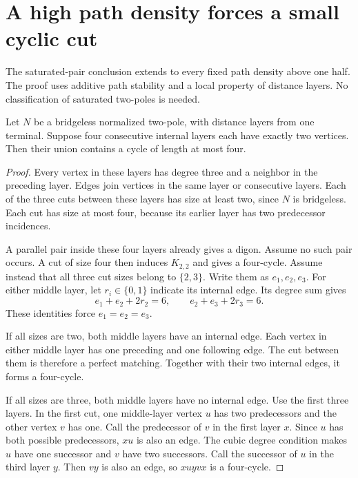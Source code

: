 \section{A high path density forces a small cyclic cut}
\label{sec:high-density-small-cut}

The saturated-pair conclusion extends to every fixed path density above one half.
The proof uses additive path stability and a local property of distance layers.
No classification of saturated two-poles is needed.

\begin{lemma}
\label{lem:four-thin-layers-short-cycle}
Let $N$ be a bridgeless normalized two-pole, with distance layers from one terminal.
Suppose four consecutive internal layers each have exactly two vertices.
Then their union contains a cycle of length at most four.
\end{lemma}

\begin{proof}
Every vertex in these layers has degree three and a neighbor in the preceding layer.
Edges join vertices in the same layer or consecutive layers.
Each of the three cuts between these layers has size at least two, since $N$ is bridgeless.
Each cut has size at most four, because its earlier layer has two predecessor incidences.

A parallel pair inside these four layers already gives a digon.
Assume no such pair occurs.
A cut of size four then induces $K_{2,2}$ and gives a four-cycle.
Assume instead that all three cut sizes belong to $\{2,3\}$.
Write them as $e_1,e_2,e_3$.
For either middle layer, let $r_i\in\{0,1\}$ indicate its internal edge.
Its degree sum gives
\[
 e_1+e_2+2r_2=6,\qquad e_2+e_3+2r_3=6.
\]
These identities force $e_1=e_2=e_3$.

If all sizes are two, both middle layers have an internal edge.
Each vertex in either middle layer has one preceding and one following edge.
The cut between them is therefore a perfect matching.
Together with their two internal edges, it forms a four-cycle.

If all sizes are three, both middle layers have no internal edge.
Use the first three layers.
In the first cut, one middle-layer vertex $u$ has two predecessors and the other vertex $v$ has one.
Call the predecessor of $v$ in the first layer $x$.
Since $u$ has both possible predecessors, $xu$ is also an edge.
The cubic degree condition makes $u$ have one successor and $v$ have two successors.
Call the successor of $u$ in the third layer $y$.
Then $vy$ is also an edge, so $xuyvx$ is a four-cycle.
\end{proof}

